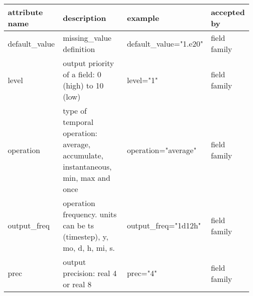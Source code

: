 \documentclass[../main/NEMO_manual]{subfiles}
\begin{document}
\begin{table}
  \begin{tabularx}{\textwidth}{|l|X|l|l|}
    \hline
    attribute name                                                                                       &
    description                                                                                          &
    example                                                                                              &
    accepted by                            \\
    \hline
    \hline
    default\_value                                                                                       &
    missing\_value definition                                                                            &
    default\_value="1.e20"                                                                               &
    field family                           \\
    \hline
    level                                                                                                &
    output priority of a field: 0 (high) to 10 (low)                                                     &
    level="1"                                                                                            &
    field family                           \\
    \hline
    operation                                                                                            &
    type of temporal operation: average, accumulate, instantaneous, min, max and once                    &
    operation="average"                                                                                  &
    field family                           \\
    \hline
    output\_freq                                                                                         &
    operation frequency. units can be ts (timestep), y, mo, d, h, mi, s.                                 &
    output\_freq="1d12h"                                                                                 &
    field family                           \\
    \hline
    prec                                                                                                 &
    output precision: real 4 or real 8                                                                   &
    prec="4"                                                                                             &
    field family                           \\

\end{tabularx}
\end{table}
\end{document}

